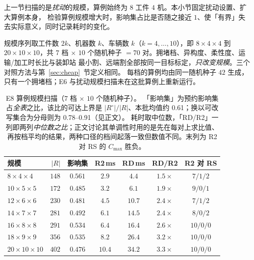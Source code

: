 \documentclass[manuscript,screen,review]{acmart}
\newcommand{\NSeeds}{10}
\newcommand{\ScaleKs}{7}
\newcommand{\ScalePairs}{70}
\newcommand{\ScaleJobsHi}{20}
\newcommand{\ScaleMachHi}{10}
\newcommand{\ScaleAliveShare}{0.61}  %
\newcommand{\ScaleCloAliveLo}{0.78}  %
\newcommand{\ScaleCloAliveHi}{0.91}  %
\begin{document}
上一节扫描的是\emph{扰动}的规模，算例始终为 \(8\) 工件 \(4\) 机。本小节固定扰动设置、扩大算例本身，
检验算例规模增大时，影响集占比是否随之接近 \(1\)、使「有界」失去实际意义，同时记录耗时的变化。

规模序列取工件数 \(2k\)、机器数 \(k\)、车辆数 \(k\)（\(k=4,\dots,10\)），即 \(8\times4\times4\) 到
\(\ScaleJobsHi\times\ScaleMachHi\times\ScaleMachHi\)，共 \(\ScaleKs\) 档 \(\times\)
\(\NSeeds\) 个随机种子 \(=\ScalePairs\) 对。拥堵档、异构度、柔性度、运输/加工时长比与装卸站
最小割、远端割全部按同一目标标定，\emph{只改变规模}。三个对照方法与第~\ref{sec:cheap}~节定义相同。
每档的算例均由同一随机种子 \(42\) 生成，只有一个拥堵档；E6 与扰动规模扫描未在这批算例上重新运行。

\begin{table}[t]
\centering
\caption{E8 算例规模扫描（\(\ScaleKs\) 档 \(\times\) \(\NSeeds\) 个随机种子）。
「影响集」为预约影响集占\emph{全表}之比，该比的可达上界是 \(|R^{\circ}|/|R|\)、本批均值约
\ScaleAliveShare；换以可改写集合为分母则为 \ScaleCloAliveLo--\ScaleCloAliveHi（见正文）。
耗时取中位数，「RD/R2」一列即两列\emph{中位数之比}；正文讨论其单调性时用的是先在每对上求比值、
再按档平均的结果，两种口径的档间起落一致但数值不同。末列为 R2 对 RS 的 \(C_{\max}\) 胜负。}
\label{tab:instscale}
\small
\begin{tabular}{@{}lrccccc@{}}
\toprule
规模 & \(|R|\) & 影响集 & R2\,ms & RD\,ms & RD/R2 & R2 对 RS \\
\midrule
\(8\times4\times4\)    & \(148\) & \(0.561\) & \(2.9\)  & \(4.4\)  & \(1.5\times\) & \(7/1/2\) \\
\(10\times5\times5\)   & \(172\) & \(0.485\) & \(3.2\)  & \(6.1\)  & \(1.9\times\) & \(9/0/1\) \\
\(12\times6\times6\)   & \(230\) & \(0.481\) & \(4.5\)  & \(10.7\) & \(2.4\times\) & \(7/1/2\) \\
\(14\times7\times7\)   & \(281\) & \(0.492\) & \(6.1\)  & \(14.5\) & \(2.4\times\) & \(8/0/2\) \\
\(16\times8\times8\)   & \(291\) & \(0.534\) & \(6.4\)  & \(16.4\) & \(2.6\times\) & \(10/0/0\) \\
\(18\times9\times9\)   & \(356\) & \(0.535\) & \(8.2\)  & \(26.4\) & \(3.2\times\) & \(10/0/0\) \\
\(20\times10\times10\) & \(402\) & \(0.476\) & \(10.4\) & \(34.2\) & \(3.3\times\) & \(10/0/0\) \\
\bottomrule
\end{tabular}
\end{table}
\end{document}
